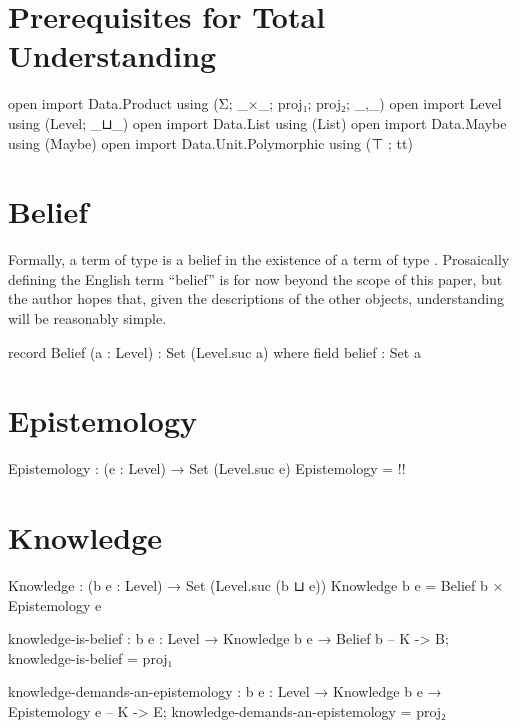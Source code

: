 \documentclass{article}
\begin{document}
\section{Prerequisites for Total Understanding}

\begin{code}
open import Data.Product using (Σ; _×_; proj₁; proj₂; _,_)
open import Level using (Level; _⊔_)
open import Data.List using (List)
open import Data.Maybe using (Maybe)
open import Data.Unit.Polymorphic using (⊤ ; tt)
\end{code}

\section{Belief}
Formally, a term  of type   is a belief in the existence of a term of type  .  Prosaically defining the English term ``belief'' is for now beyond the scope of this paper, but the author hopes that, given the descriptions of the other objects, understanding  will be reasonably simple.

\begin{code}
record Belief (a : Level) : Set (Level.suc a) where
  field
    belief : Set a
\end{code}

\section{Epistemology}

\begin{code}
Epistemology : (e : Level) → Set (Level.suc e)
Epistemology = {!!}
\end{code}

\section{Knowledge}

\begin{code}
Knowledge : (b e : Level) → Set (Level.suc (b ⊔ e))
Knowledge b e = Belief b × Epistemology e
\end{code}

\begin{code}
knowledge-is-belief : {b e : Level} → Knowledge b e → Belief b -- K -> B;
knowledge-is-belief = proj₁
\end{code}

\begin{code}
knowledge-demands-an-epistemology :
  {b e : Level} → Knowledge b e → Epistemology e -- K -> E;
knowledge-demands-an-epistemology = proj₂
\end{code}
\end{document}
